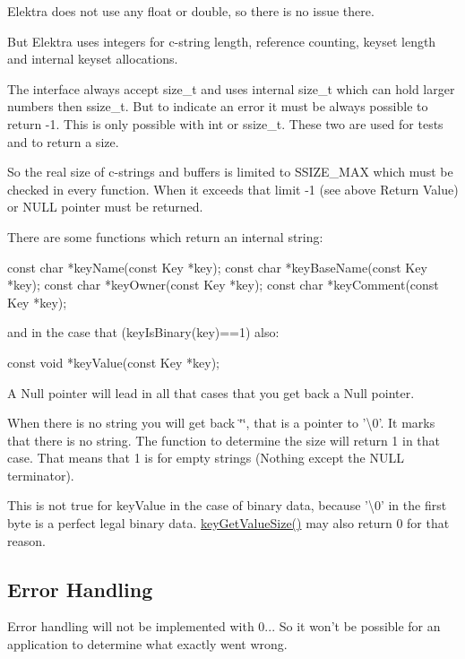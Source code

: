 Elektra does not use any float or double, so there is no issue there.

But Elektra uses integers for c-\/string length, reference counting, keyset length and internal keyset allocations.

The interface always accept size\+\_\+t and uses internal size\+\_\+t which can hold larger numbers then ssize\+\_\+t. But to indicate an error it must be always possible to return -\/1. This is only possible with int or ssize\+\_\+t. These two are used for tests and to return a size.

So the real size of c-\/strings and buffers is limited to S\+S\+I\+Z\+E\+\_\+\+M\+A\+X which must be checked in every function. When it exceeds that limit -\/1 (see above Return Value) or N\+U\+L\+L pointer must be returned.

There are some functions which return an internal string\+: \begin{DoxyVerb}    const char *keyName(const Key *key);  
    const char *keyBaseName(const Key *key);  
    const char *keyOwner(const Key *key);  
    const char *keyComment(const Key *key);  
\end{DoxyVerb}


and in the case that ({\ttfamily key\+Is\+Binary(key)==1}) also\+: \begin{DoxyVerb}    const void *keyValue(const Key *key);  
\end{DoxyVerb}


A Null pointer will lead in all that cases that you get back a Null pointer.

When there is no string you will get back \char`\"{}\char`\"{}, that is a pointer to '\textbackslash{}0'. It marks that there is no string. The function to determine the size will return 1 in that case. That means that 1 is for empty strings (Nothing except the N\+U\+L\+L terminator).

This is not true for key\+Value in the case of binary data, because '\textbackslash{}0' in the first byte is a perfect legal binary data. \hyperlink{group__keyvalue_gae326672fffb7474abfe9baf53b73217e}{key\+Get\+Value\+Size()} may also return 0 for that reason.

\subsection*{Error Handling}

Error handling will not be implemented with 0... So it won't be possible for an application to determine what exactly went wrong.

